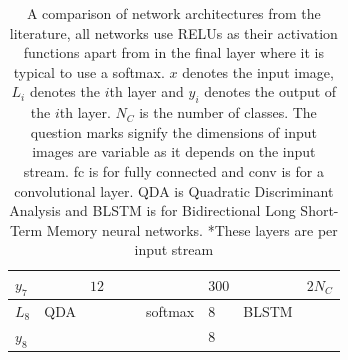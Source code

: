 \begin{landscape}
\begin{table}[h!]
{\begin{tabular}{|lllllllll|}
    \multicolumn{1}{|l|}{$y_7$}   &          & \multicolumn{1}{l|}{$12$}                          &          & \multicolumn{1}{l|}{}                                &               & \multicolumn{1}{l|}{$300$}                       &           & $2N_{C}$                       \\ \hline
    \multicolumn{1}{|l|}{$L_8$}   & QDA      & \multicolumn{1}{l|}{}                              &          & \multicolumn{1}{l|}{}                                & softmax       & \multicolumn{1}{l|}{$8$}                         & BLSTM     &                                \\
    \multicolumn{1}{|l|}{$y_8$}   &          & \multicolumn{1}{l|}{}                              &          & \multicolumn{1}{l|}{}                                &               & \multicolumn{1}{l|}{$8$}                         &           &                                \\ \hline
    \end{tabular}

    \caption{A comparison of network architectures from the literature, all networks
    use RELUs as their activation functions apart from in the final layer where it is
    typical to use a softmax. $x$ denotes the input image, $L_i$ denotes the $i$th layer and $y_i$ denotes the output of the $i$th layer.
    $N_{C}$ is the number of classes.
    The question marks signify the dimensions of input images are variable as it depends on the input stream. fc is for fully connected and
    conv is for a convolutional layer. QDA is Quadratic Discriminant Analysis and BLSTM is for Bidirectional Long Short-Term Memory neural
    networks.
    \newline
    *These layers are per input stream} \label{tab:compnet}

}
\end{table}
\end{landscape}

